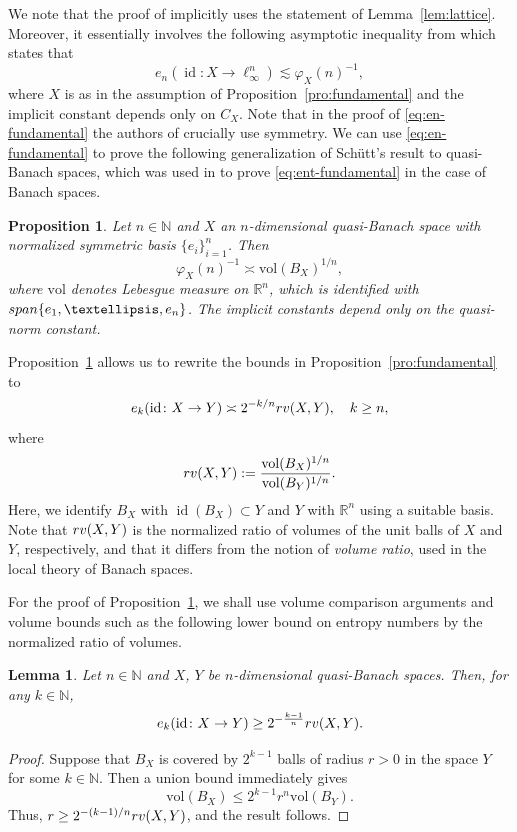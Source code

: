 \documentclass[a4paper,12pt]{article}
\newtheorem{lem}[thm]{Lemma}
\newtheorem{prop}[thm]{Proposition}
\theoremstyle{definition}
\newcommand{\N}{\mathbb{N}}
\newcommand{\IN}{\mathbb{N}}
\newcommand{\IR}{\mathbb{R}}
\newcommand{\vol}{\mathrm{vol}}
\DeclareMathOperator{\id}{id}
\begin{document}
We note that the proof of \cite[Theorem~4.2]{Kae17} implicitly uses the statement of Lemma~\ref{lem:lattice}. Moreover, it essentially involves the following asymptotic inequality from \cite[Section 4, Lemma 3 (ii)]{EN98} which states that
\begin{equation} \label{eq:en-fundamental}
e_n(\id\colon X\to \ell_{\infty}^n)
\lesssim  \varphi_X(n)^{-1},
\end{equation}
where $X$ is as in the assumption of Proposition~\ref{pro:fundamental} and the implicit constant depends only on $C_X$. Note that in the proof of \eqref{eq:en-fundamental} the authors of \cite{EN98} crucially use symmetry. We can use \eqref{eq:en-fundamental} to prove the following generalization of Schütt's result \cite[Lemma 3]{Sch84} to quasi-Banach spaces, which was used in \cite{Sch84} to prove \eqref{eq:ent-fundamental} in the case of Banach spaces. 

\begin{prop}\label{pro:fundamental-vol}
Let $n\in\N$ and $X$ an $n$-dimensional quasi-Banach space with normalized symmetric basis $\{e_i\}_{i=1}^n$. Then
\[
\varphi_X(n)^{-1}\asymp \vol(B_X)^{1/n}, 
\]
where $\vol$ denotes Lebesgue measure on $\IR^n$, which is identified with ${\rm span}\{e_1,\dots,e_n\}$. The implicit constants depend only on the quasi-norm constant.
\end{prop}

Proposition~\ref{pro:fundamental-vol} allows us to rewrite the bounds in Proposition~\ref{pro:fundamental} to 
\begin{equation} \label{eq:vol-large}
	e_k(\id\colon X\to Y) \asymp 2^{-k/n}{\rm rv}(X,Y),\quad k\ge n,
\end{equation}
where
\[
{\rm rv}(X,Y):=\frac{\vol(B_X)^{1/n}}{\vol(B_Y)^{1/n}}.
\]
Here, we identify $B_X$ with $\id(B_X)\subset Y$ and $Y$ with $\IR^n$ using a suitable basis.
Note that ${\rm rv}(X,Y)$ is the normalized ratio of volumes of the unit balls of $X$ and $Y$, respectively, and that it differs from the notion of \emph{volume ratio}, used in the local theory of Banach spaces.

For the proof of Proposition~\ref{pro:fundamental-vol}, we shall use volume comparison arguments and volume bounds such as the following lower bound on entropy numbers by the normalized ratio of volumes.

\begin{lem}\label{lem:vol-lower}
Let $n\in\N$ and $X$, $Y$ be $n$-dimensional quasi-Banach spaces. Then, for any $k\in\IN$,
\[
e_k(\id\colon X\to Y) \ge 2^{-\frac{k-1}{n}}{\rm rv}(X,Y).%
\]
\end{lem}
\begin{proof}
Suppose that $B_X$ is covered by $2^{k-1}$ balls of radius $r>0$ in the space $Y$ for some $k\in\IN$. Then a union bound immediately gives 
\[
\vol(B_X)\le 2^{k-1}r^n\vol(B_Y).
\]
Thus, $r\ge 2^{-(k-1)/n}{\rm rv}(X,Y)$, and the result follows.
\end{proof}
\end{document}
